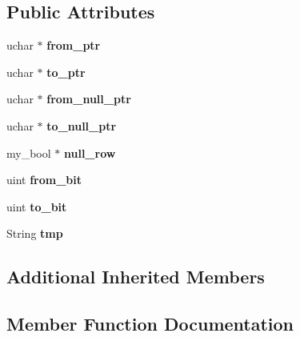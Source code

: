\subsection*{Public Attributes}
\begin{DoxyCompactItemize}
\item 
\mbox{\label{classCopy__field_a5f42e0c3c7772b67769e545a07e6fc12}} 
uchar $\ast$ {\bfseries from\+\_\+ptr}
\item 
\mbox{\label{classCopy__field_a72aafe6982a1ce1642ee37eb9cb192c4}} 
uchar $\ast$ {\bfseries to\+\_\+ptr}
\item 
\mbox{\label{classCopy__field_a2135833beaf9f76ecb7638bcd6fde252}} 
uchar $\ast$ {\bfseries from\+\_\+null\+\_\+ptr}
\item 
\mbox{\label{classCopy__field_aa4e2c19d44bc7722cd405f31527d09a0}} 
uchar $\ast$ {\bfseries to\+\_\+null\+\_\+ptr}
\item 
\mbox{\label{classCopy__field_a9ba7a03137346a45bd0e168d6bf56049}} 
my\+\_\+bool $\ast$ {\bfseries null\+\_\+row}
\item 
\mbox{\label{classCopy__field_a1789167015de72b36d6d947d0e0259e4}} 
uint {\bfseries from\+\_\+bit}
\item 
\mbox{\label{classCopy__field_a58049ea5e8c99c8a044475b3b676680a}} 
uint {\bfseries to\+\_\+bit}
\item 
\mbox{\label{classCopy__field_a1a5dc5a99a78218905a487dd50f996cc}} 
String {\bfseries tmp}
\end{DoxyCompactItemize}
\subsection*{Additional Inherited Members}


\subsection{Member Function Documentation}
\mbox{\label{classCopy__field_afd94df7df118797ab8f39c9eeb2c1093}} 
